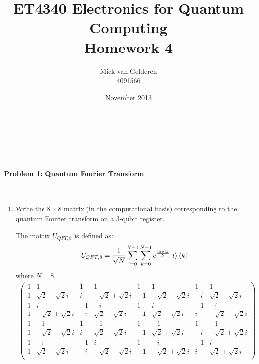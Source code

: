 \documentclass[12pt]{article}
\title{ET4340 Electronics for Quantum Computing\\Homework 4}
\author{
    Mick van Gelderen\\4091566
}
\date{November 2013}
\newcommand{\pmat}[1]{\begin{pmatrix}#1\end{pmatrix}}
\newcommand{\rsqrt}[1]{\ensuremath{\frac{1}{\sqrt{#1}}}}
\newenvironment{answer}{\begingroup\setlength{\leftskip}{-\leftmargin}\begin{framed}}{\end{framed}\endgroup}
\begin{document}
\maketitle
\hfill\\\\\\

\paragraph{Problem 1: Quantum Fourier Transform} \hfill \\

\begin{enumerate}

    \item Write the $8\times8$ matrix (in the computational basis) corresponding to the quantum Fourier transform on a 3-qubit register.

    \begin{answer}
        The matrix $U_{QFT,8}$ is defined as:
        \begin{align*}
            U_{QFT,8} = \rsqrt{N}\sum\limits_{l = 0}^{N - 1}\sum\limits_{k = 0}^{N - 1}e^{\frac{i2\pi{}lk}{N}}\ket{l}\bra{k}
        \end{align*}
        where $N = 8$.
        \begin{align*}\pmat{
            1 &  1 &  1 &  1 &  1 &  1 &  1 &  1 \\
            1 &  \sqrt{2} + \sqrt{2}i & i & -\sqrt{2} + \sqrt{2}i & -1 & -\sqrt{2} - \sqrt{2}i & -i &  \sqrt{2} - \sqrt{2}i \\
            1 & i & -1 & -i &  1 & i & -1 & -i \\
            1 & -\sqrt{2} + \sqrt{2}i & -i &  \sqrt{2} + \sqrt{2}i & -1 &  \sqrt{2} - \sqrt{2}i & i & -\sqrt{2} - \sqrt{2}i \\
            1 & -1 &  1 & -1 &  1 & -1 &  1 & -1 \\
            1 & -\sqrt{2} - \sqrt{2}i & i &  \sqrt{2} - \sqrt{2}i & -1 &  \sqrt{2} + \sqrt{2}i & -i & -\sqrt{2} + \sqrt{2}i \\
            1 & -i & -1 & i &  1 & -i & -1 & i \\
            1 &  \sqrt{2} - \sqrt{2}i & -i & -\sqrt{2} - \sqrt{2}i & -1 & -\sqrt{2} + \sqrt{2}i & i &  \sqrt{2} + \sqrt{2}i \\
        }\end{align*}
    \end{answer}


\end{enumerate}
\end{document}
